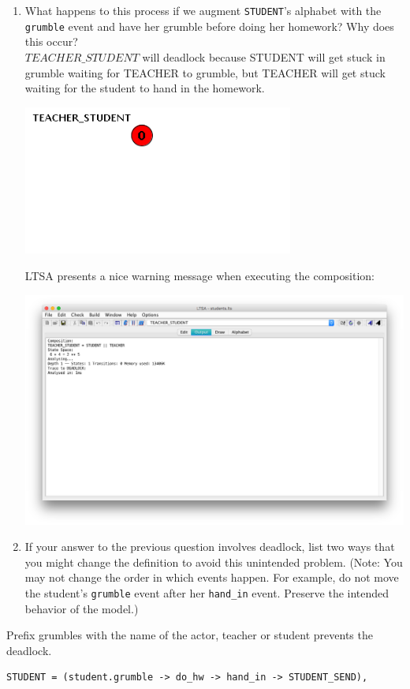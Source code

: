 \documentclass{article}
\begin{document}
\begin{enumerate}
\begin{enumerate}
  
\item What happens to this process if we augment \texttt{STUDENT}'s alphabet with the \texttt{grumble} event and
have her grumble before doing her homework? Why does this occur? \\

$TEACHER\_STUDENT$ will deadlock because STUDENT will get stuck in grumble waiting for TEACHER to grumble, but TEACHER will get stuck waiting for the student to hand in the homework. 

\begin{center}
\includegraphics[width=3.5in]{DEADLOCK.png}
\end{center}
LTSA presents a nice warning message when executing the composition: 
\begin{center}
\includegraphics[width=5in]{DEADLOCK2.png}
\end{center}

\item If your answer to the previous question involves deadlock, list
two ways that you might change the definition to avoid this
unintended problem. ({\sc Note}: You may not change the order in which events happen. For example, do not move the student's \texttt{grumble} event after her \texttt{hand\_in} event. Preserve the intended behavior of the model.)
\end{enumerate}
Prefix grumbles with the name of the actor, teacher or student prevents the deadlock. \\
\begin{verbatim}
STUDENT = (student.grumble -> do_hw -> hand_in -> STUDENT_SEND),
       

\end{verbatim}
\end{enumerate}
\end{document}
